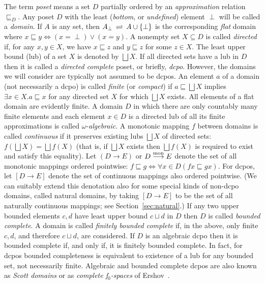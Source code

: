 \documentclass[fleqn]{LMCS}
\theoremstyle{plain}\newtheorem{satz}[thm]{Satz}
\theoremstyle{plain}\newtheorem{hyp}[thm]{Hypothesis}
\theoremstyle{plain}\newtheorem{hyps}[thm]{Hypotheses}
\theoremstyle{definition}\newtheorem{note}[thm]{Note}
\newcommand{\bYdef}{\mathrel{\BYDEF}}
\newcommand{\BYDEF}{\mbox{$\hspace{.2em}\rightleftharpoons\hspace{.2em}$}}
\newcommand{\arr}{\rightarrow}
\newcommand{\arrr}{\longrightarrow}
\newcommand{\Arra}{\Leftrightarrow}
\newcommand{\Undef}{{\perp}}
\newcommand{\Lub}{\bigsqcup}
\newcommand{\sqle}{\sqsubseteq}
\newcommand{\?}{\mbox{?}}
\begin{document}
The term {\em poset} means a set $D$ partially ordered 
by an {\em approximation} relation $\sqle_D$. 
Any poset $D$ with the least ({\em bottom}, or {\em undefined}) 
element $\Undef$ will be called a \emph{domain}. 
If $A$ is any set, then $A_{\Undef}\bYdef A\cup\{\Undef\}$ is the
corresponding {\em flat} domain where $x\sqle y\Arra (x=\Undef) \vee (x=y)$. 
A nonempty set $X\subseteq D$ is called \emph{directed} 
if, for any $x,y\in X$, we have $x\sqle z$ and $y\sqle z$ 
for some $z\in X$. 
The least upper bound (lub) of a set $X$ is denoted by $\Lub X$. 
If all directed sets have a lub in $D$ 
then it is called a {\em directed complete} 
poset, or briefly, \emph{dcpo}. 
However, the domains we will consider are typically not assumed to be dcpos. 
An element $a$ of a domain (not necessarily a dcpo) is called 
\emph{finite} (or \emph{compact}) 
if $a\sqle\Lub X$ implies $\exists x\in X.a\sqle x$ for any
directed set $X$ for which $\Lub X$ exists. 
All elements of a flat domain are evidently finite. 
A 
domain $D$ in which 
there are only countably many finite elements 
and each element $x\in D$ is a directed lub of all its finite approximations 
is called 
$\omega$-\emph{algebraic}. 
A monotonic mapping $f$ between domains is called 
\emph{continuous} 
if it preserves 
existing lubs $\Lub X$ of directed sets: 
$f(\bigsqcup X)=\bigsqcup f(X)$ 
(that is, if $\bigsqcup X$ exists then $\bigsqcup f(X)$ 
is required to exist and satisfy this equality). 
Let $(D\arr E)$ or $D\stackrel{\rm mon}{\arrr} E$ 
denote the set of all monotonic mappings ordered pointwise: 
$
f\sqsubseteq g\iff\forall x\in D(fx\sqsubseteq gx).
$
For dcpos, let $[D\arr E]$ denote the set of continuous mappings also 
ordered pointwise. 
(We can suitably extend this denotation also for some special kinds 
of non-dcpo domains, called natural domains, by taking $[D\arr E]$ to be 
the set of all naturally continuous mappings; see Section~\ref{sec:natural}.) 
If any two upper bounded elements $c,d$ have least upper bound $c\sqcup d$ 
in $D$ then $D$ is called \emph{bounded complete}. 
A domain is called \emph{finitely bounded complete} if, in the above, 
only finite $c,d$, and therefore $c\sqcup d$, are considered. 
If $D$ is an algebraic dcpo then 
it is bounded complete if, and only if, it is finitely bounded complete. 
In fact, for dcpos bounded completeness is equivalent to existence of a lub for 
any bounded set, not necessarily finite. 
Algebraic and bounded complete dcpos are also known as \emph{Scott domains} 
or as \emph{complete f$_0$-spaces} of Ershov~\cite{Ershov72}. 
\end{document}
